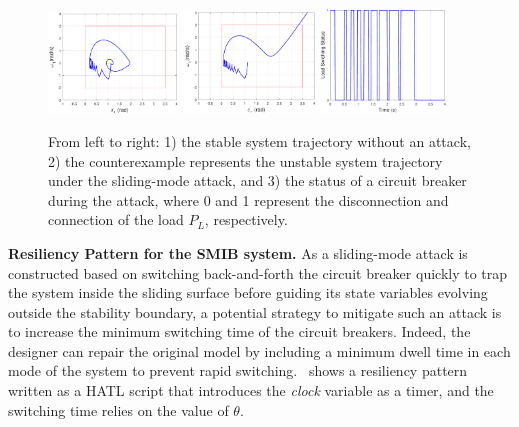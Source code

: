 \begin{figure}[t!]%
	\centering%
    \includegraphics[width=0.31\textwidth]{image/normal}%
		\includegraphics[width=0.31\textwidth]{image/counter}%
		\includegraphics[width=0.3\textwidth]{image/load_v2}%
	\caption{From left to right: 1) the stable system trajectory without an attack, 2) the counterexample represents the unstable system trajectory under the sliding-mode attack, and 3) the status of a circuit breaker during the attack, where 0 and 1 represent the disconnection and connection of the load $P_L$, respectively.}%
\end{figure}%




\vspace{0.5em}
\noindent
{\bf Resiliency Pattern for the SMIB system.} 
As a sliding-mode attack is constructed based on switching back-and-forth the circuit breaker quickly to trap the system inside the sliding surface before guiding its state variables evolving outside the stability boundary, a potential strategy to mitigate such an attack is to increase the minimum switching time of the circuit breakers. Indeed, the designer can repair the original model by including a minimum dwell time in each mode of the system to prevent rapid switching.~ shows a resiliency pattern written as a HATL script that introduces the \emph{clock} variable as a timer, and the switching time relies on the value of $\theta$.

